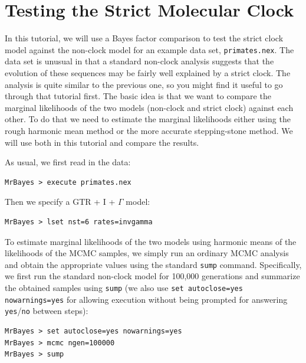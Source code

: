 \documentclass[12pt]{book}
\newcommand{\ttt}[1]{\texttt{#1}}
\begin{document}
\section{Testing the Strict Molecular Clock}
\label{strictClock}

In this tutorial, we will use a Bayes factor comparison to test the strict clock model against the
non-clock model for an example data set, \ttt{primates.nex}. The data set is unusual in that a
standard non-clock analysis suggests that the evolution of these sequences may be fairly well
explained by a strict clock. The analysis is quite similar to the previous one, so you might find
it useful to go through that tutorial first. The basic idea is that we want to compare the marginal
likelihoods of the two models (non-clock and strict clock) against each other. To do that we need
to estimate the marginal likelihoods either using the rough harmonic mean method or the more
accurate stepping-stone method. We will use both in this tutorial and compare the results.

As usual, we first read in the data:

\begin{singlespacing}
\small
\begin{verbatim}
MrBayes > execute primates.nex
\end{verbatim}
\end{singlespacing}
\normalsize

Then we specify a GTR + I + $\Gamma$ model:

\begin{singlespacing}
\small
\begin{verbatim}
MrBayes > lset nst=6 rates=invgamma
\end{verbatim}
\end{singlespacing}
\normalsize

To estimate marginal likelihoods of the two models using harmonic means of the likelihoods of the
MCMC samples, we simply run an ordinary MCMC analysis and obtain the appropriate values using the
standard \ttt{sump} command. Specifically, we first run the standard non-clock model for 100,000
generations and summarize the obtained samples using \ttt{sump} (we also use \ttt{set autoclose=yes
nowarnings=yes} for allowing execution without being prompted for answering \ttt{yes}/\ttt{no}
between steps):

\begin{singlespacing}
\small
\begin{verbatim}
MrBayes > set autoclose=yes nowarnings=yes
MrBayes > mcmc ngen=100000
MrBayes > sump
\end{verbatim}
\end{singlespacing}
\normalsize
\end{document}
